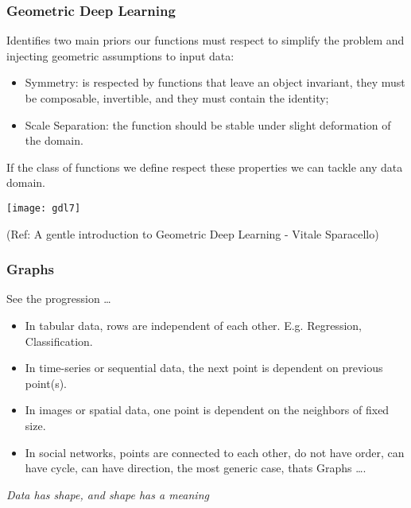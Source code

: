 \begin{frame}[fragile]\frametitle{Geometric Deep Learning}

Identifies two main priors our functions must respect to simplify the problem and injecting geometric assumptions to input data:

\begin{itemize}
\item Symmetry: is respected by functions that leave an object invariant, they must be composable, invertible, and they must contain the identity;
\item Scale Separation: the function should be stable under slight deformation of the domain.
\end{itemize}
	
	 If the class of functions we define respect these properties we can tackle any data domain.
	 
\begin{center}
\texttt{[image: gdl7]}
\end{center}

{\tiny (Ref: A gentle introduction to Geometric Deep Learning - Vitale Sparacello)}	
\end{frame}

\begin{frame}[fragile]\frametitle{Graphs}

See the progression \ldots

\begin{itemize}
\item In tabular data, rows are independent of each other. E.g. Regression, Classification.
\item In time-series or sequential data, the next point is dependent on previous point(s).
\item In images or spatial data, one point is dependent on the neighbors of fixed size.
\item In social networks, points are connected to each other, do not have order, can have cycle, can have direction, the most generic case, thats Graphs \ldots.
\end{itemize}
	
	{\em Data has shape, and shape has a meaning}
	


\end{frame}

